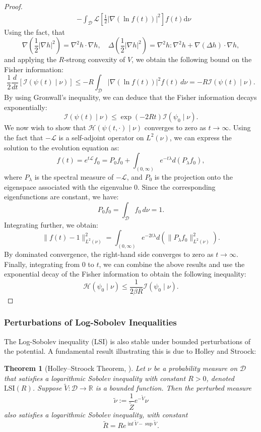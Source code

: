 \documentclass[11pt, twoside]{report}
\newtheorem{theorem}{Theorem}[section]
\begin{document}
\begin{proof}
\begin{equation}
\begin{aligned}
& -\int_{\mathcal{D}} \mathcal{L}\left[\frac{1}{2}|\nabla(\ln f(t))|^2\right] f(t) \mathrm{d} \nu
\end{aligned}
\end{equation}
Using the fact, that
\begin{equation}
\nabla\left(\frac{1}{2}|\nabla h|^2\right)=\nabla^2 h \cdot \nabla h, \quad \Delta\left(\frac{1}{2}|\nabla h|^2\right)=\nabla^2 h: \nabla^2 h+\nabla(\Delta h) \cdot \nabla h,
\end{equation}
and applying the $R$-strong convexity of $V$, we obtain the following bound on the Fisher information:
\[
\frac{1}{2} \frac{d}{dt} \left[ \mathcal{I}(\psi(t) \mid \nu) \right] \leqslant -R \int_{\mathcal{D}} |\nabla(\ln f(t))|^2 f(t) \, d\nu = -R \mathcal{I}(\psi(t) \mid \nu).
\]
By using Gronwall's inequality, we can deduce that the Fisher information decays exponentially:
\[
\mathcal{I}(\psi(t) \mid \nu) \leq \exp(-2Rt) \mathcal{I}(\psi_0 \mid \nu).
\]
We now wish to show that $ \mathcal{H}(\psi(t,\cdot) \mid \nu) $ converges to zero as $ t \to \infty $. Using the fact that $ -\mathcal{L} $ is a self-adjoint operator on $ L^2(\nu) $, we can express the solution to the evolution equation as:
\[
f(t) = e^{t \mathcal{L}} f_0 = P_0 f_0 + \int_{(0, \infty)} e^{-t \lambda} d(P_\lambda f_0),
\]
where $ P_\lambda $ is the spectral measure of $ -\mathcal{L} $, and $ P_0 $ is the projection onto the eigenspace associated with the eigenvalue $ 0 $. Since the corresponding eigenfunctions are constant, we have:
\[
P_0 f_0 = \int_\mathcal{D} f_0 \, d\nu = 1.
\]
Integrating further, we obtain:
\[
\| f(t) - 1 \|^2_{L^2(\nu)} = \int_{(0, \infty)} e^{-2t \lambda} d \left( \| P_\lambda f_0 \|^2_{L^2(\nu)} \right).
\]
By dominated convergence, the right-hand side converges to zero as $ t \to \infty $. Finally, integrating from $ 0 $ to $ t $, we can combine the above results and use the exponential decay of the Fisher information to obtain the following inequality:
\[
\mathcal{H}(\psi_0 \mid \nu) \leq \frac{1}{2 \beta R} \mathcal{I}(\psi_0 \mid \nu).
\]
\end{proof}
\subsubsection{Perturbations of Log-Sobolev Inequalities}

The Log-Sobolev inequality (LSI) is also stable under bounded perturbations of the potential. A fundamental result illustrating this is due to Holley and Stroock:

\begin{theorem}[Holley--Stroock Theorem, \cite{Holley1987}]
Let $\nu$ be a probability measure on $\mathcal{D}$ that satisfies a logarithmic Sobolev inequality with constant $R > 0$, denoted $\mathrm{LSI}(R)$. Suppose $\tilde{V}:\mathcal{D} \to \mathbb{R}$ is a bounded function. Then the perturbed measure
\[
\tilde{\nu} := \frac{1}{\tilde{Z}} e^{-\tilde{V}} \nu
\]
also satisfies a logarithmic Sobolev inequality, with constant
\[
\tilde{R} = R e^{\inf \tilde{V} - \sup \tilde{V}}.
\]
\end{theorem}
\end{document}
